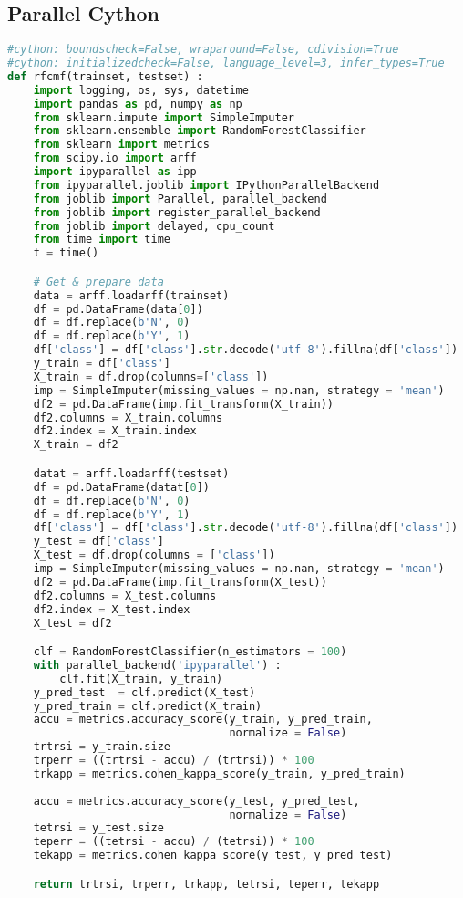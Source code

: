 \subsection{Parallel Cython}
\begin{lstlisting}[language=Python, caption={Parallel Cython implementation of the RF test case - Cython module.}]
#cython: boundscheck=False, wraparound=False, cdivision=True
#cython: initializedcheck=False, language_level=3, infer_types=True
def rfcmf(trainset, testset) :
    import logging, os, sys, datetime
    import pandas as pd, numpy as np
    from sklearn.impute import SimpleImputer
    from sklearn.ensemble import RandomForestClassifier
    from sklearn import metrics
    from scipy.io import arff
    import ipyparallel as ipp
    from ipyparallel.joblib import IPythonParallelBackend
    from joblib import Parallel, parallel_backend
    from joblib import register_parallel_backend
    from joblib import delayed, cpu_count
    from time import time
    t = time()

    # Get & prepare data
    data = arff.loadarff(trainset)
    df = pd.DataFrame(data[0])
    df = df.replace(b'N', 0)
    df = df.replace(b'Y', 1)
    df['class'] = df['class'].str.decode('utf-8').fillna(df['class'])
    y_train = df['class']
    X_train = df.drop(columns=['class'])
    imp = SimpleImputer(missing_values = np.nan, strategy = 'mean')
    df2 = pd.DataFrame(imp.fit_transform(X_train))
    df2.columns = X_train.columns
    df2.index = X_train.index
    X_train = df2

    datat = arff.loadarff(testset)
    df = pd.DataFrame(datat[0])
    df = df.replace(b'N', 0)
    df = df.replace(b'Y', 1)
    df['class'] = df['class'].str.decode('utf-8').fillna(df['class'])
    y_test = df['class']
    X_test = df.drop(columns = ['class'])
    imp = SimpleImputer(missing_values = np.nan, strategy = 'mean')
    df2 = pd.DataFrame(imp.fit_transform(X_test))
    df2.columns = X_test.columns
    df2.index = X_test.index
    X_test = df2

    clf = RandomForestClassifier(n_estimators = 100)
    with parallel_backend('ipyparallel') :
        clf.fit(X_train, y_train)
    y_pred_test  = clf.predict(X_test)
    y_pred_train = clf.predict(X_train)
    accu = metrics.accuracy_score(y_train, y_pred_train,
                                  normalize = False)
    trtrsi = y_train.size
    trperr = ((trtrsi - accu) / (trtrsi)) * 100
    trkapp = metrics.cohen_kappa_score(y_train, y_pred_train)
    
    accu = metrics.accuracy_score(y_test, y_pred_test, 
                                  normalize = False)
    tetrsi = y_test.size
    teperr = ((tetrsi - accu) / (tetrsi)) * 100
    tekapp = metrics.cohen_kappa_score(y_test, y_pred_test)

    return trtrsi, trperr, trkapp, tetrsi, teperr, tekapp
\end{lstlisting}





